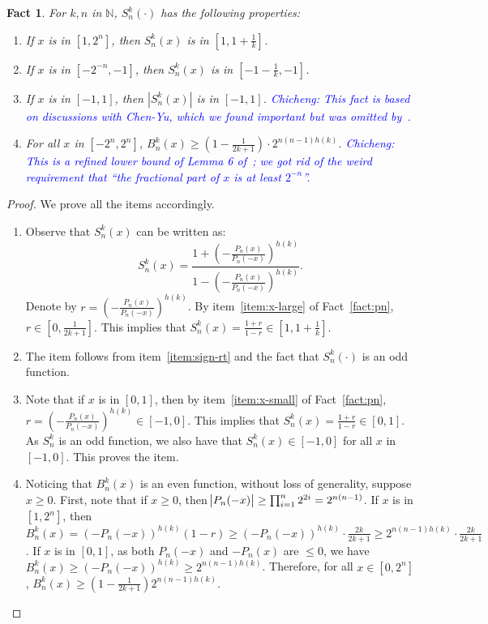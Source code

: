 \documentclass{article}
\newcommand{\field}[1]{\mathbb{#1}}
\newcommand{\fN}{\field{N}}
\newcommand{\cz}[1]{\textcolor{blue}{Chicheng: #1}}
\newtheorem{fact}[theorem]{Fact}
\begin{document}
\begin{fact}
For $k, n$ in $\fN$, $S_n^k(\cdot)$ has the following properties:
\begin{enumerate}
\item If $x$ is in $[1, 2^n]$, then $S_n^k(x)$ is in $[1, 1 + \frac 1 k]$. \label{item:sign-rt}
\item If $x$ is in $[-2^{-n}, -1]$, then $S_n^k(x)$ is in $[-1 - \frac 1 k, -1]$. \label{item:sign-lt}
\item If $x$ is in $[-1, 1]$, then $|S_n^k(x)|$ is in $[-1, 1]$. \label{item:sign-mid}
\cz{This fact is based on discussions with Chen-Yu, which we found important but was omitted by~\cite{klivans2004learning}.}
\item For all $x$ in $[-2^{n}, 2^{n}]$, $B_n^k(x) \geq (1-\frac{1}{2k+1}) \cdot 2^{n(n-1)h(k)}$.
\cz{This is a refined lower bound of Lemma 6 of~\cite{klivans2004learning}; we got rid of the weird
requirement that ``the fractional part of $x$ is at least $2^{-n}$''.}
\label{item:sign-denom}
\end{enumerate}
\label{fact:newman}
\end{fact}
\begin{proof}
We prove all the items accordingly.
\begin{enumerate}
\item Observe that $S_n^k(x)$ can be written as:
\[ S_n^k(x) = \frac{1 + (-\frac{P_n(x)}{P_n(-x)})^{h(k)}}{ 1 - (-\frac{P_n(x)}{P_n(-x)})^{h(k)} }.  \]
Denote by $r = (-\frac{P_n(x)}{P_n(-x)})^{h(k)}$. By item~\ref{item:x-large} of Fact~\ref{fact:pn}, $r \in [0, \frac{1}{2k+1}]$. This implies that
$S_n^k(x) = \frac{1+r}{1-r} \in [1, 1 + \frac 1 k]$.

\item The item follows from item~\ref{item:sign-rt} and the fact that $S_n^k(\cdot)$ is an odd function.

\item Note that if $x$ is in $[0, 1]$, then by item~\ref{item:x-small} of Fact~\ref{fact:pn}, $r = (-\frac{P_n(x)}{P_n(-x)})^{h(k)} \in [-1, 0]$. This implies that $S_n^k(x) = \frac{1+r}{1-r} \in [0,1]$. As $S_n^k$ is an odd function, we also have that $S_n^k(x) \in [-1, 0]$ for all $x$ in $[-1, 0]$. This proves the item.

\item Noticing that $B_n^k(x)$ is an even function, without loss of generality, suppose $x \geq 0$.
First, note that if $x \geq 0$, then $\abs{P_n(-x)} \geq \prod_{i=1}^n 2^{2i} = 2^{n(n-1)}$.
If $x$ is in $[1,2^n]$, then $B_n^k(x) = (-P_n(-x))^{h(k)} (1 - r) \geq (-P_n(-x))^{h(k)} \cdot \frac{2k}{2k+1} \geq 2^{n(n-1)h(k)} \cdot \frac{2k}{2k+1}$.
If $x$ is in $[0,1]$, as both $P_n(-x)$ and $-P_n(x)$ are $\leq 0$, we have $B_n^k(x) \geq (-P_n(-x))^{h(k)} \geq 2^{n(n-1)h(k)}$. Therefore, for all $x \in [0,2^n]$,
$B_n^k(x) \geq (1-\frac{1}{2k+1}) 2^{n(n-1)h(k)}$.
\end{enumerate}
\end{proof}
\end{document}
